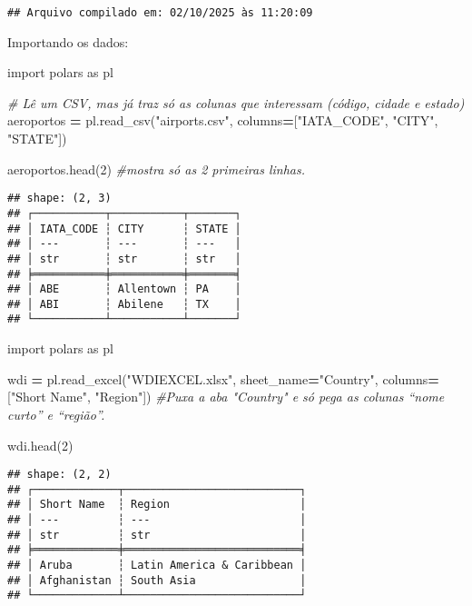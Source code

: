 \documentclass[
]{article}
\newenvironment{Shaded}{\begin{snugshade}}{\end{snugshade}}
\newcommand{\CommentTok}[1]{\textcolor[rgb]{0.56,0.35,0.01}{\textit{#1}}}
\newcommand{\DecValTok}[1]{\textcolor[rgb]{0.00,0.00,0.81}{#1}}
\newcommand{\ImportTok}[1]{#1}
\newcommand{\NormalTok}[1]{#1}
\newcommand{\OperatorTok}[1]{\textcolor[rgb]{0.81,0.36,0.00}{\textbf{#1}}}
\newcommand{\StringTok}[1]{\textcolor[rgb]{0.31,0.60,0.02}{#1}}
\begin{document}
\begin{verbatim}
## Arquivo compilado em: 02/10/2025 às 11:20:09
\end{verbatim}

Importando os dados:

\begin{Shaded}
\begin{Highlighting}[]
\ImportTok{import}\NormalTok{ polars }\ImportTok{as}\NormalTok{ pl}

\CommentTok{\# Lê um CSV, mas já traz só as colunas que interessam (código, cidade e estado)}
\NormalTok{aeroportos }\OperatorTok{=}\NormalTok{ pl.read\_csv(}\StringTok{"airports.csv"}\NormalTok{,}
\NormalTok{                         columns}\OperatorTok{=}\NormalTok{[}\StringTok{"IATA\_CODE"}\NormalTok{, }\StringTok{"CITY"}\NormalTok{, }\StringTok{"STATE"}\NormalTok{])}

\NormalTok{aeroportos.head(}\DecValTok{2}\NormalTok{) }\CommentTok{\#mostra só as 2 primeiras linhas.}
\end{Highlighting}
\end{Shaded}

\begin{verbatim}
## shape: (2, 3)
## ┌───────────┬───────────┬───────┐
## │ IATA_CODE ┆ CITY      ┆ STATE │
## │ ---       ┆ ---       ┆ ---   │
## │ str       ┆ str       ┆ str   │
## ╞═══════════╪═══════════╪═══════╡
## │ ABE       ┆ Allentown ┆ PA    │
## │ ABI       ┆ Abilene   ┆ TX    │
## └───────────┴───────────┴───────┘
\end{verbatim}

\begin{Shaded}
\begin{Highlighting}[]
\ImportTok{import}\NormalTok{ polars }\ImportTok{as}\NormalTok{ pl}

\NormalTok{wdi }\OperatorTok{=}\NormalTok{ pl.read\_excel(}\StringTok{"WDIEXCEL.xlsx"}\NormalTok{, sheet\_name}\OperatorTok{=}\StringTok{"Country"}\NormalTok{, }
\NormalTok{                    columns}\OperatorTok{=}\NormalTok{[}\StringTok{"Short Name"}\NormalTok{, }\StringTok{"Region"}\NormalTok{]) }\CommentTok{\#Puxa a aba "Country" e só pega as colunas “nome curto” e “região”.}

\NormalTok{wdi.head(}\DecValTok{2}\NormalTok{)}
\end{Highlighting}
\end{Shaded}

\begin{verbatim}
## shape: (2, 2)
## ┌─────────────┬───────────────────────────┐
## │ Short Name  ┆ Region                    │
## │ ---         ┆ ---                       │
## │ str         ┆ str                       │
## ╞═════════════╪═══════════════════════════╡
## │ Aruba       ┆ Latin America & Caribbean │
## │ Afghanistan ┆ South Asia                │
## └─────────────┴───────────────────────────┘
\end{verbatim}
\end{document}
